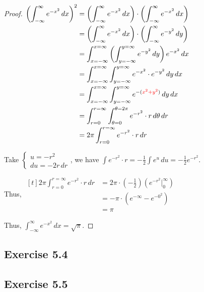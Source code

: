 \begin{proof}
$\begin{aligned}[t]
    \left( \int_{-\infty}^{\infty} e^{-x^2} \,dx \right)^2
     & = \left( \int_{-\infty}^{\infty} e^{-x^2} \,dx \right) \cdot \left( \int_{-\infty}^{\infty} e^{-x^2} \,dx \right) \\
     & = \left( \int_{-\infty}^{\infty} e^{-x^2} \,dx \right) \cdot \left( \int_{-\infty}^{\infty} e^{-y^2} \,dy \right) \\
     & = \int_{x=-\infty}^{x=\infty} \left( \int_{y=-\infty}^{y=\infty} e^{-y^2} \,dy \right) e^{-x^2} \,dx              \\
     & = \int_{x=-\infty}^{x=\infty} \int_{y=-\infty}^{y=\infty} e^{-x^2} \cdot e^{-y^2} \,dy \,dx                       \\
     & = \int_{x=-\infty}^{x=\infty} \int_{y=-\infty}^{y=\infty} e^{{-(\color{red}x^2 + y^2})} \,dy \,dx                 \\
     & = \int_{r=0}^{r=\infty} \int_{\theta=0}^{\theta=2\pi} e^{-r^2} \cdot r \,d\theta \,dr                             \\
     & = 2\pi \int_{r=0}^{r=\infty} e^{-r^2} \cdot r \,dr
\end{aligned}$

Take $\begin{cases} u = -r^2 \\ du = -2r \,dr \end{cases}$, we have $\int e^{-r^2} \cdot r = -\frac{1}{2} \int e^u \,du = -\frac{1}{2} e^{-r^2}$. 

Thus, $\begin{aligned}[t]
    2\pi \int_{r=0}^{r=\infty} e^{-r^2} \cdot r \,dr
     & = 2\pi \cdot \left( -\frac{1}{2} \right) \left( e^{-r^2} \bigg|_{0}^{\infty} \right) \\
     & = -\pi \cdot (e^{-\infty} - e^{-0^2})                                                \\
     & = \pi
\end{aligned}$

Thus, $\int_{-\infty}^\infty e^{-x^2} \,dx = \sqrt{\pi}$. 
\end{proof}

\subsection*{Exercise 5.4}

\subsection*{Exercise 5.5}

